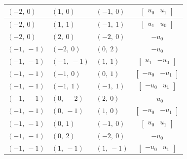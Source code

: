 \documentclass[11pt]{article}
\theoremstyle{definition}
\begin{document}
\begin{longtable}{|l|l|l|c|}
    \hline
    $\left( -2, \  0\right)$ & $\left( 1, \  0\right)$ & $\left( -1, \  0\right)$ & $\left[\begin{matrix}u_{0} & u_{1}\end{matrix}\right]$ \\
    \hline
    $\left( -2, \  0\right)$ & $\left( 1, \  1\right)$ & $\left( -1, \  1\right)$ & $\left[\begin{matrix}u_{1} & u_{0}\end{matrix}\right]$ \\
    \hline
    $\left( -2, \  0\right)$ & $\left( 2, \  0\right)$ & $\left( -2, \  0\right)$ & $- u_{0}$ \\
    \hline
    $\left( -1, \  -1\right)$ & $\left( -2, \  0\right)$ & $\left( 0, \  2\right)$ & $- u_{0}$ \\
    \hline
    $\left( -1, \  -1\right)$ & $\left( -1, \  -1\right)$ & $\left( 1, \  1\right)$ & $\left[\begin{matrix}u_{1} & - u_{0}\end{matrix}\right]$ \\
    \hline
    $\left( -1, \  -1\right)$ & $\left( -1, \  0\right)$ & $\left( 0, \  1\right)$ & $\left[\begin{matrix}- u_{0} & - u_{1}\end{matrix}\right]$ \\
    \hline
    $\left( -1, \  -1\right)$ & $\left( -1, \  1\right)$ & $\left( -1, \  1\right)$ & $\left[\begin{matrix}- u_{0} & u_{1}\end{matrix}\right]$ \\
    \hline
    $\left( -1, \  -1\right)$ & $\left( 0, \  -2\right)$ & $\left( 2, \  0\right)$ & $- u_{0}$ \\
    \hline
    $\left( -1, \  -1\right)$ & $\left( 0, \  -1\right)$ & $\left( 1, \  0\right)$ & $\left[\begin{matrix}- u_{0} & - u_{1}\end{matrix}\right]$ \\
    \hline
    $\left( -1, \  -1\right)$ & $\left( 0, \  1\right)$ & $\left( -1, \  0\right)$ & $\left[\begin{matrix}u_{0} & u_{1}\end{matrix}\right]$ \\
    \hline
    $\left( -1, \  -1\right)$ & $\left( 0, \  2\right)$ & $\left( -2, \  0\right)$ & $- u_{0}$ \\
    \hline
    $\left( -1, \  -1\right)$ & $\left( 1, \  -1\right)$ & $\left( 1, \  -1\right)$ & $\left[\begin{matrix}- u_{0} & u_{1}\end{matrix}\right]$ \\

\end{longtable}
\end{document}

